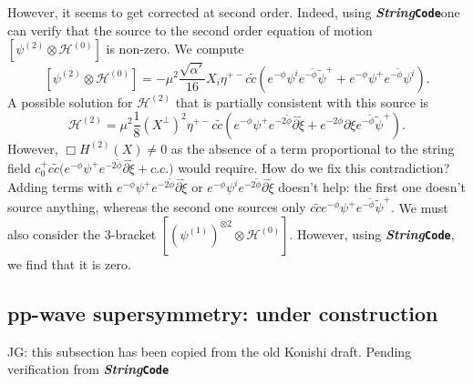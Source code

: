 \documentclass[12pt]{article}
\numberwithin{equation}{section}
\newcommand{\WT}[1]{\widetilde{#1}}
\newcommand{\m}[1]{\mathcal{#1}}
\newcommand{\StringCode}{\textbf{\textit{String}}{\color{scpurple}\textbf{\texttt{Code}}}}
\newcommand{\B}[1]{\bar{#1}}
\begin{document}
However, it seems to get corrected at second order. Indeed, using \StringCode one can verify that the source to the second order equation of motion $\left[\psi^{(2)}\otimes \m{H}^{(0)}\right]$ is non-zero. We compute
\begin{equation}
    \left[\psi^{(2)}\otimes \m{H}^{(0)}\right] = -\mu^2\frac{\sqrt{\alpha'}}{16}X_i\eta^{+-}c\WT{c}\left(e^{-\phi}\psi^i e^{-\WT{\phi}}\WT{\psi}^++e^{-\phi}\psi^+ e^{-\WT{\phi}}\psi^i\right).
\end{equation}
A possible solution for $\m{H}^{(2)}$ that is partially consistent with this source is
\begin{equation}
    \m{H}^{(2)} = \mu^2\frac{1}{8}(X^{\perp})^2\eta^{+-} c\WT{c}\left(e^{-\phi}\psi^+ e^{-2\WT{\phi}}\B{\partial}\WT{\xi} + e^{-2\phi}\partial\xi e^{-\WT{\phi}}\WT{\psi}^+\right).
\end{equation}
However, $\Box H^{(2)}(X)\neq0$ as the absence of a term proportional to the string field  $c_0^+c\WT{c}\big(e^{-\phi}\psi^+ e^{-2\WT{\phi}}\B{\partial}\WT{\xi} + c.c.\big)$ would require. \textcolor{scpurple}{How do we fix this contradiction? Adding terms with $e^{-\phi}\psi^+e^{-2\WT{\phi}}\B{\partial}\WT{\xi}$ or $e^{-\phi}\psi^i e^{-2\WT{\phi}}\B{\partial}\WT{\xi}$ doesn't help: the first one doesn't source anything, whereas the second one sources only $c\WT{c}e^{-\phi}\psi^+ e^{-\WT{\phi}}\WT{\psi}^+$.} We must also consider the 3-bracket $\left[(\psi^{(1)})^{\otimes 2}\otimes \m{H}^{(0)}\right]$. However, using \StringCode, we find that it is zero.


\subsection{pp-wave supersymmetry: under construction}
\textcolor{scpurple}{JG: this subsection has been copied from the old Konishi draft. Pending verification from \StringCode}
\end{document}
